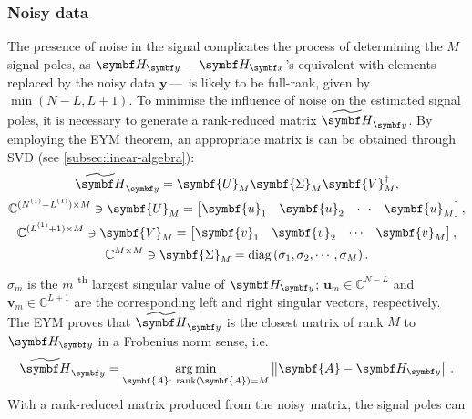 \subsubsection{Noisy data}
The presence of noise in the signal complicates the process of
determining the $M$ signal poles, as $\Hy$\,---\,$\Hx$'s equivalent with
elements replaced by the noisy data $\symbf{y}$\,---\, is likely to be
full-rank, given by $\min(N - L, L + 1)$. To minimise the influence of noise on
the estimated signal poles, it is necessary to
generate a rank-reduced matrix $\Hytilde$. By employing the \ac{EYM}
theorem\cite[Section~2.2]{Golub2013}, an appropriate matrix is can be obtained
through \ac{SVD} (see \cref{subsec:linear-algebra}):
\begin{subequations}
    \begin{gather}
    \Hytilde =
        \symbf{U}_M^{\vphantom{\dagger}}
        \symbf{\Sigma}_M^{\vphantom{\dagger}}
        \symbf{V}_M^{\dagger},\\
    \mathbb{C}^{(\None - \Lone) \times M} \ni
        \symbf{U}_M^{\vphantom{\dagger}} =
        \begin{bmatrix}
            \symbf{u}_1 &
            \symbf{u}_2 &
            \cdots &
            \symbf{u}_M
        \end{bmatrix},\\
    \mathbb{C}^{(\Lone + 1) \times M} \ni
        \symbf{V}_M^{\vphantom{\dagger}} =
        \begin{bmatrix}
            \symbf{v}_1 &
            \symbf{v}_2 &
            \cdots &
            \symbf{v}_M
        \end{bmatrix},\\
    \mathbb{C}^{M \times M} \ni
        \symbf{\Sigma}_M^{\vphantom{\dagger}} =
        \diag \left( \sigma_1, \sigma_2, \cdots, \sigma_M \right).
    \end{gather}
\end{subequations}
$\sigma_m$ is the $m$ \textsuperscript{th} largest singular value of $\Hy$;
$\symbf{u}_m \in \mathbb{C}^{N - L}$ and $\symbf{v}_m \in
\mathbb{C}^{L+1}$ are the corresponding left and right singular vectors,
respectively. The \ac{EYM} proves that $\Hytilde$ is the closest matrix of rank
$M$ to $\Hy$ in a Frobenius norm sense, i.e.
\begin{equation}
    \Hytilde = \argmin_{\symbf{A}:\ \rank(\symbf{A}) = M} \left \lVert \symbf{A} - \Hy \right \rVert.
\end{equation}
With a rank-reduced matrix produced from the noisy matrix, the signal poles can
